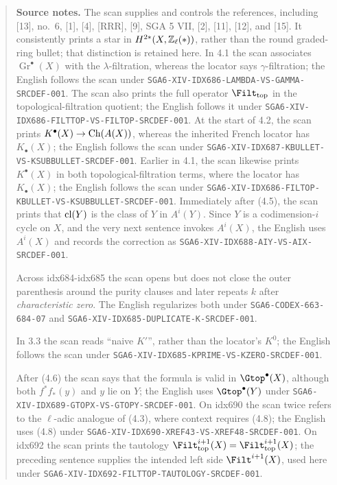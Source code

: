 \begin{quote}\footnotesize\raggedright
\textbf{Source notes.}
The scan supplies and controls the references, including [13], no.~6, [1],
[4], [RRR], [9], SGA 5 VII, [2], [11], [12], and [15]. It consistently
prints a star in $H^{2*}(X,\mathbb Z_\ell(*))$, rather than the round graded-ring
bullet; that distinction is retained here. In 4.1 the scan associates
$\operatorname{Gr}^\bullet(X)$ with the $\lambda$-filtration, whereas the
locator says $\gamma$-filtration; the English follows the scan under
\nolinkurl{SGA6-XIV-IDX686-LAMBDA-VS-GAMMA-SRCDEF-001}. The scan also prints
the full operator $\Filt_{\mathrm{top}}$ in the topological-filtration
quotient; the English follows it under
\nolinkurl{SGA6-XIV-IDX686-FILTTOP-VS-FILTOP-SRCDEF-001}. At the start of 4.2,
the scan
prints $K^\bullet(X)\to\operatorname{Ch}(A(X))$, whereas the inherited French locator has
$K_\bullet(X)$; the English follows the scan under
\nolinkurl{SGA6-XIV-IDX687-KBULLET-VS-KSUBBULLET-SRCDEF-001}. Earlier in 4.1, the
scan likewise prints $K^\bullet(X)$ in both topological-filtration terms,
where the locator has $K_\bullet(X)$; the English follows the scan under
\nolinkurl{SGA6-XIV-IDX686-FILTOP-KBULLET-VS-KSUBBULLET-SRCDEF-001}. Immediately after (4.5), the
scan prints that $\operatorname{cl}(Y)$ is the class of $Y$ in $A^i(Y)$. Since $Y$ is a
codimension-$i$ cycle on $X$, and the very next sentence invokes $A^i(X)$,
the English uses $A^i(X)$ and records the correction as
\nolinkurl{SGA6-XIV-IDX688-AIY-VS-AIX-SRCDEF-001}.

Across idx684-idx685 the scan opens but does not close the outer parenthesis
around the purity clauses and later repeats $k$ after \emph{characteristic
zero}. The English regularizes both under
\nolinkurl{SGA6-CODEX-663-684-07} and
\nolinkurl{SGA6-XIV-IDX685-DUPLICATE-K-SRCDEF-001}.

In 3.3 the scan reads ``naive $K'$'', rather than the locator's $K^0$; the
English follows the scan under
\nolinkurl{SGA6-XIV-IDX685-KPRIME-VS-KZERO-SRCDEF-001}.

After (4.6) the scan says that the formula is valid in
$\Gtop^\bullet(X)$, although both $f^*f_*(y)$ and $y$ lie on $Y$; the
English uses $\Gtop^\bullet(Y)$ under
\nolinkurl{SGA6-XIV-IDX689-GTOPX-VS-GTOPY-SRCDEF-001}. On idx690 the scan
twice refers to the $\ell$-adic analogue of (4.3), where context requires
(4.8); the English uses (4.8) under
\nolinkurl{SGA6-XIV-IDX690-XREF43-VS-XREF48-SRCDEF-001}. On idx692 the scan
prints the tautology
$\Filt_{\mathrm{top}}^{i+1}(X)=\Filt_{\mathrm{top}}^{i+1}(X)$; the
preceding sentence supplies the intended left side $\Filt^{i+1}(X)$, used
here under \nolinkurl{SGA6-XIV-IDX692-FILTTOP-TAUTOLOGY-SRCDEF-001}.


\end{quote}
